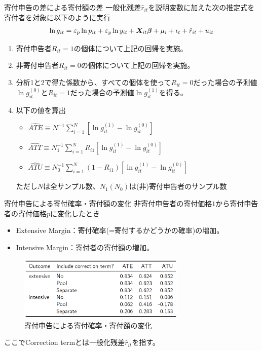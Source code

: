 \documentclass[dvipdfmx,10pt]{beamer}
\begin{document}
\begin{frame}{寄付申告の差による寄付額の差}
一般化残差$\hat{r}_{it}$を説明変数に加えた次の推定式を寄付者を対象に以下のように実行
		\begin{align}
			\ln g_{it} = \varepsilon_p\ln p_{it}+\varepsilon_y \ln y_{it} + \bm{X}_{it}\bm{\beta} + \mu_i + \iota_t + \hat{r}_{it}+u_{it}\notag
		\end{align}
		\begin{enumerate}
			\item 寄付申告者$R_{it}=1$の個体について上記の回帰を実施。
			\item 非寄付申告者$R_{it}=0$の個体について上記の回帰を実施。
			\item 分析1と2で得た係数から、すべての個体を使って$R_{it}=0$だった場合の予測値$\ln g_{it}^{(0)}$と$R_{it}=1$だった場合の予測値$\ln g_{it}^{(1)}$を得る。
			\item 以下の値を算出
			\begin{itemize}
				\item $\hat{ATE}\equiv N^{-1}\sum_{i=1}^N[\ln g_{it}^{(1)}-\ln g_{it}^{(0)}]$
				\item $\hat{ATT}\equiv N_1^{-1}\sum_{i=1}^NR_{i1}[\ln g_{it}^{(1)}-\ln g_{it}^{(0)}]$
				\item $\hat{ATU}\equiv N_0^{-1}\sum_{i=1}^N(1-R_{i1})[\ln g_{it}^{(1)}-\ln g_{it}^{(0)}]$
			\end{itemize}
			ただし$N$は全サンプル数、$N_1(N_0)$は(非)寄付申告者のサンプル数
		\end{enumerate}
	\end{frame}

\begin{frame}{寄付申告による寄付確率・寄付額の変化}
	非寄付申告者の寄付価格$1$から寄付申告者の寄付価格$p$に変化したとき
	\begin{itemize}
		\item Extensive Margin：寄付確率(=寄付するかどうかの確率)の増加。
		\item Intensive Margin：寄付者の寄付額の増加。
	\end{itemize}
	\begin{figure}
		\centering
		\includegraphics[width=8cm]{Tab_CF}
		\caption{寄付申告による寄付確率・寄付額の変化}
		\label{fig:tabcf}
	\end{figure}
	ここでCorrection termとは一般化残差$\hat{r}_{it}$を指す。
\end{frame}
\end{document}
